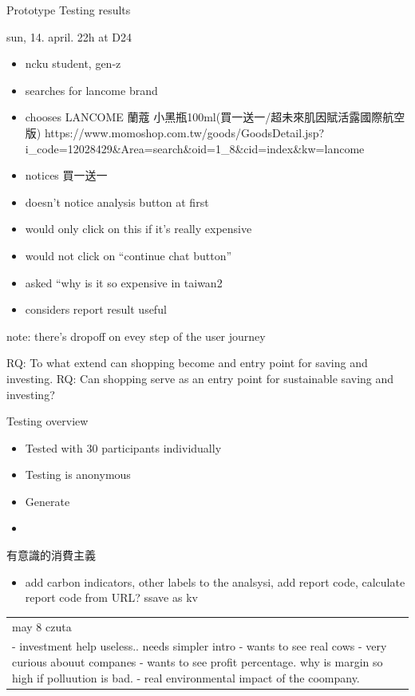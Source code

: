\documentclass[
  letterpaper,
  DIV=11,
  numbers=noendperiod]{scrartcl}
\providecommand{\tightlist}{%
  \setlength{\itemsep}{0pt}\setlength{\parskip}{0pt}}\usepackage{longtable,booktabs,array}
\begin{document}
Prototype Testing results

sun, 14. april. 22h at D24

\begin{itemize}
\tightlist
\item
  ncku student, gen-z
\item
  searches for lancome brand
\item
  chooses LANCOME 蘭蔻 小黑瓶100ml(買一送一/超未來肌因賦活露國際航空版)
  https://www.momoshop.com.tw/goods/GoodsDetail.jsp?i\_code=12028429\&Area=search\&oid=1\_8\&cid=index\&kw=lancome
\item
  notices 買一送一
\item
  doesn't notice analysis button at first
\item
  would only click on this if it's really expensive
\item
  would not click on ``continue chat button''
\item
  asked ``why is it so expensive in taiwan2
\item
  considers report result useful
\end{itemize}

note: there's dropoff on evey step of the user journey

RQ: To what extend can shopping become and entry point for saving and
investing. RQ: Can shopping serve as an entry point for sustainable
saving and investing?

Testing overview

\begin{itemize}
\tightlist
\item
  Tested with 30 participants individually
\item
  Testing is anonymous
\item
  Generate
\item
\end{itemize}

有意識的消費主義

\begin{itemize}
\tightlist
\item
  add carbon indicators, other labels to the analsysi, add report code,
  calculate report code from URL? ssave as kv
\end{itemize}

\begin{longtable}[]{@{}
  >{\raggedright\arraybackslash}p{}@{}}
\toprule\noalign{}
\endhead
\bottomrule\noalign{}
\endlastfoot
may 8 czuta \\
- investment help useless.. needs simpler intro - wants to see real cows
- very curious abouut companes - wants to see profit percentage. why is
margin so high if polluution is bad. - real environmental impact of the
coompany. \\
\end{longtable}
\end{document}
